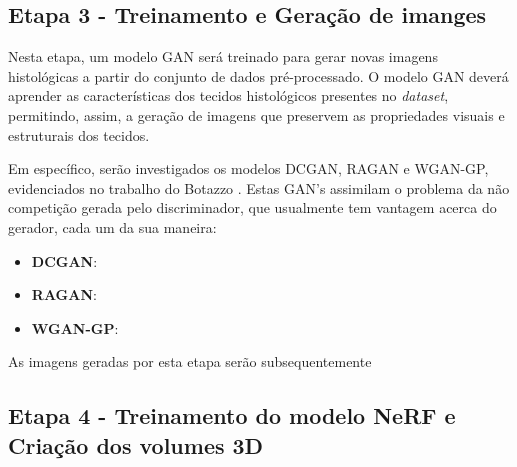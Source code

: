 \subsection{Etapa 3 - Treinamento e Geração de imanges}

Nesta etapa, um modelo GAN será treinado para gerar novas imagens histológicas a partir do conjunto de dados pré-processado. O modelo GAN deverá aprender as características dos tecidos histológicos presentes no \textit{dataset}, permitindo, assim, a geração de imagens que preservem as propriedades visuais e estruturais dos tecidos.

Em específico, serão investigados os modelos DCGAN, RAGAN e WGAN-GP, evidenciados no trabalho do Botazzo \cite{rozendo2024histdataaug}. Estas GAN's assimilam o problema da não competição gerada pelo discriminador, que usualmente tem vantagem acerca do gerador, cada um da sua maneira:
\begin{itemize}
  \item \textbf{DCGAN}: 
  \item \textbf{RAGAN}:
  \item \textbf{WGAN-GP}:
\end{itemize}

As imagens geradas por esta etapa serão subsequentemente 


\subsection{Etapa 4 - Treinamento do modelo NeRF e Criação dos volumes 3D}

